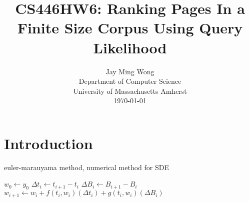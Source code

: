 \documentclass{IEEEtran}
\begin{document}
\title{CS446HW6: Ranking Pages In a Finite Size Corpus Using Query Likelihood}
\author{Jay Ming Wong \\Department of Computer Science\\University of Massachusetts Amherst\\ \today}

\maketitle

\section{Introduction}

\begin{algorithm}[H]
\caption{euler-marauyama method, numerical method for SDE}\label{buildindex}
\begin{algorithmic}[1]
\State $w_0 \gets y_0$
\State $\Delta t_i \gets t_{i+1} - t_i$
\State $\Delta B_i \gets B_{i+1} - B_i$
\State $w_{i+1} \gets w_i + f(t_i, w_i)(\Delta t_i) + g(t_i,w_i)(\Delta B_i)$
\EndFor


\EndProcedure
\end{algorithmic}
\end{algorithm}
\end{document}
